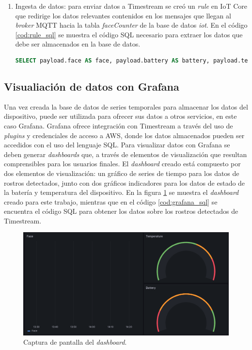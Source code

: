 \begin{enumerate}
	\item Ingesta de datos: para enviar datos a Timestream se creó un \textit{rule} en IoT Core que redirige los datos relevantes contenidos en los mensajes que llegan al \textit{broker} MQTT hacia la tabla \textit{faceCounter} de la base de datos \textit{iot}. En el código \ref{cod:rule_sql} se muestra el código SQL necesario para extraer los datos que debe ser almacenados en la base de datos.
\begin{lstlisting}[language=SQL, label=cod:rule_sql,caption=Código SQL del \textit{rule} para alcenar datos en Timestream.]
SELECT payload.face AS face, payload.battery AS battery, payload.temperature AS temperature FROM 'faceCounter/data_in'
\end{lstlisting}	
	
\end{enumerate}

\subsection{Visualiación de datos con Grafana}
Una vez creada la base de datos de series temporales para almacenar los datos del dispositivo, puede ser utilizada para ofrecer sus datos a otros servicios, en este caso Grafana. Grafana ofrece integración con Timestream a través del uso de \textit{plugins} y credenciales de acceso a AWS, donde los datos almacenados pueden ser accedidos con el uso del lenguaje SQL. Para visualizar datos con Grafana se deben generar \textit{dashboards} que, a través de elementos de visualización que resultan comprensibles para los usuarios finales. El \textit{dashboard} creado está compuesto por dos elementos de visualización: un gráfico de series de tiempo para los datos de rostros detectados, junto con dos gráficos indicadores para los datos de estado de la batería y temperatura del dispositivo. En la figura \ref{fig:gr_dashboard} se muestra el \textit{dashboard} creado para este trabajo, mientras que en el código \ref{cod:grafana_sql} se encuentra el código SQL para obtener los datos sobre los rostros detectados de Timestream.

\begin{figure}[h]
	\centering
	\includegraphics[scale=0.35]{./Figures/cc_dashboard.png}
	\caption{Captura de pantalla del \textit{dashboard}.}
	\label{fig:gr_dashboard}
\end{figure}

